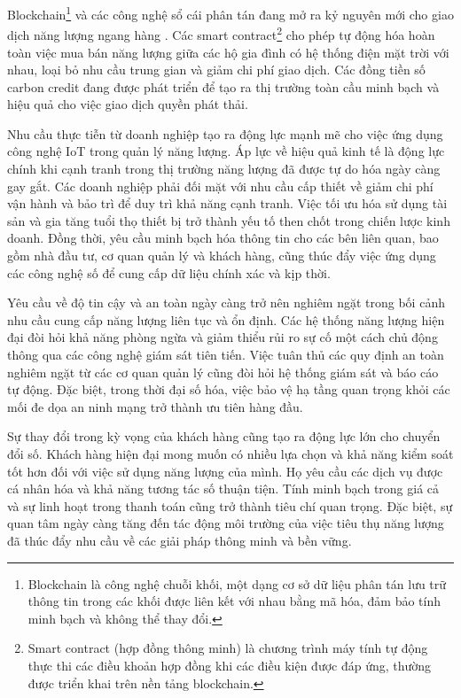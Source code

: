 \documentclass[../main.tex]{subfiles}
\begin{document}
Blockchain\footnote{Blockchain là công nghệ chuỗi khối, một dạng cơ sở dữ liệu phân tán lưu trữ thông tin trong các khối được liên kết với nhau bằng mã hóa, đảm bảo tính minh bạch và không thể thay đổi.} và các công nghệ sổ cái phân tán đang mở ra kỷ nguyên mới cho giao dịch năng lượng ngang hàng \cite{wang2023blockchain}. Các smart contract\footnote{Smart contract (hợp đồng thông minh) là chương trình máy tính tự động thực thi các điều khoản hợp đồng khi các điều kiện được đáp ứng, thường được triển khai trên nền tảng blockchain.} cho phép tự động hóa hoàn toàn việc mua bán năng lượng giữa các hộ gia đình có hệ thống điện mặt trời với nhau, loại bỏ nhu cầu trung gian và giảm chi phí giao dịch. Các đồng tiền số carbon credit đang được phát triển để tạo ra thị trường toàn cầu minh bạch và hiệu quả cho việc giao dịch quyền phát thải.

Nhu cầu thực tiễn từ doanh nghiệp tạo ra động lực mạnh mẽ cho việc ứng dụng công nghệ IoT trong quản lý năng lượng. Áp lực về hiệu quả kinh tế là động lực chính khi cạnh tranh trong thị trường năng lượng đã được tự do hóa ngày càng gay gắt. Các doanh nghiệp phải đối mặt với nhu cầu cấp thiết về giảm chi phí vận hành và bảo trì để duy trì khả năng cạnh tranh. Việc tối ưu hóa sử dụng tài sản và gia tăng tuổi thọ thiết bị trở thành yếu tố then chốt trong chiến lược kinh doanh. Đồng thời, yêu cầu minh bạch hóa thông tin cho các bên liên quan, bao gồm nhà đầu tư, cơ quan quản lý và khách hàng, cũng thúc đẩy việc ứng dụng các công nghệ số để cung cấp dữ liệu chính xác và kịp thời.

Yêu cầu về độ tin cậy và an toàn ngày càng trở nên nghiêm ngặt trong bối cảnh nhu cầu cung cấp năng lượng liên tục và ổn định. Các hệ thống năng lượng hiện đại đòi hỏi khả năng phòng ngừa và giảm thiểu rủi ro sự cố một cách chủ động thông qua các công nghệ giám sát tiên tiến. Việc tuân thủ các quy định an toàn nghiêm ngặt từ các cơ quan quản lý cũng đòi hỏi hệ thống giám sát và báo cáo tự động. Đặc biệt, trong thời đại số hóa, việc bảo vệ hạ tầng quan trọng khỏi các mối đe dọa an ninh mạng trở thành ưu tiên hàng đầu.

Sự thay đổi trong kỳ vọng của khách hàng cũng tạo ra động lực lớn cho chuyển đổi số. Khách hàng hiện đại mong muốn có nhiều lựa chọn và khả năng kiểm soát tốt hơn đối với việc sử dụng năng lượng của mình. Họ yêu cầu các dịch vụ được cá nhân hóa và khả năng tương tác số thuận tiện. Tính minh bạch trong giá cả và sự linh hoạt trong thanh toán cũng trở thành tiêu chí quan trọng. Đặc biệt, sự quan tâm ngày càng tăng đến tác động môi trường của việc tiêu thụ năng lượng đã thúc đẩy nhu cầu về các giải pháp thông minh và bền vững.
\end{document}
